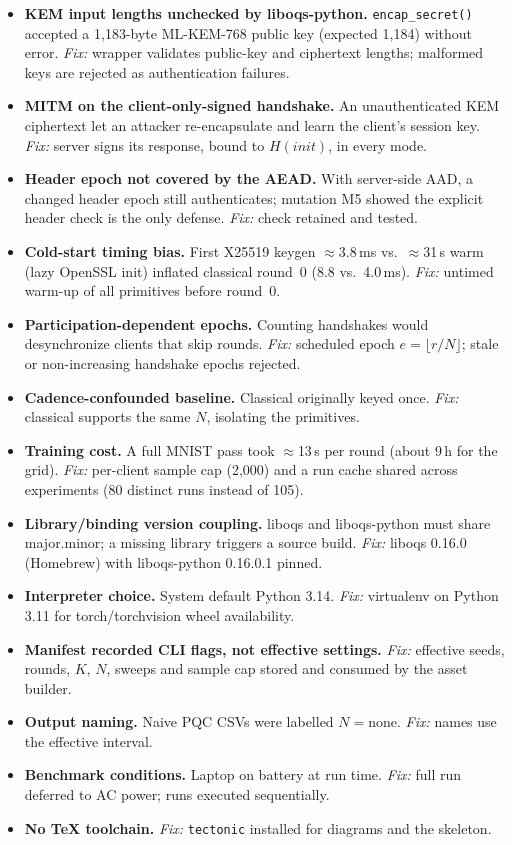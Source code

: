 \begin{itemize}
  \item \textbf{KEM input lengths unchecked by liboqs-python.} \texttt{encap\_secret()} accepted a 1,183-byte ML-KEM-768 public key (expected 1,184) without error. \emph{Fix:} wrapper validates public-key and ciphertext lengths; malformed keys are rejected as authentication failures.
  \item \textbf{MITM on the client-only-signed handshake.} An unauthenticated KEM ciphertext let an attacker re-encapsulate and learn the client's session key. \emph{Fix:} server signs its response, bound to $H(\mathit{init})$, in every mode.
  \item \textbf{Header epoch not covered by the AEAD.} With server-side AAD, a changed header epoch still authenticates; mutation M5 showed the explicit header check is the only defense. \emph{Fix:} check retained and tested.
  \item \textbf{Cold-start timing bias.} First X25519 keygen $\approx$3.8\,ms vs.\ $\approx$31\,\textmu s warm (lazy OpenSSL init) inflated classical round~0 (8.8 vs.\ 4.0\,ms). \emph{Fix:} untimed warm-up of all primitives before round~0.
  \item \textbf{Participation-dependent epochs.} Counting handshakes would desynchronize clients that skip rounds. \emph{Fix:} scheduled epoch $e=\lfloor r/N \rfloor$; stale or non-increasing handshake epochs rejected.
  \item \textbf{Cadence-confounded baseline.} Classical originally keyed once. \emph{Fix:} classical supports the same $N$, isolating the primitives.
  \item \textbf{Training cost.} A full MNIST pass took $\approx$13\,s per round (about 9\,h for the grid). \emph{Fix:} per-client sample cap (2,000) and a run cache shared across experiments (80 distinct runs instead of 105).
  \item \textbf{Library/binding version coupling.} liboqs and liboqs-python must share major.minor; a missing library triggers a source build. \emph{Fix:} liboqs 0.16.0 (Homebrew) with liboqs-python 0.16.0.1 pinned.
  \item \textbf{Interpreter choice.} System default Python 3.14. \emph{Fix:} virtualenv on Python 3.11 for torch/torchvision wheel availability.
  \item \textbf{Manifest recorded CLI flags, not effective settings.} \emph{Fix:} effective seeds, rounds, $K$, $N$, sweeps and sample cap stored and consumed by the asset builder.
  \item \textbf{Output naming.} Naive PQC CSVs were labelled $N{=}$none. \emph{Fix:} names use the effective interval.
  \item \textbf{Benchmark conditions.} Laptop on battery at run time. \emph{Fix:} full run deferred to AC power; runs executed sequentially.
  \item \textbf{No TeX toolchain.} \emph{Fix:} \texttt{tectonic} installed for diagrams and the skeleton.
\end{itemize}
